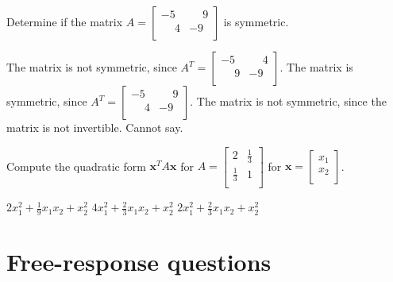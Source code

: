 \documentclass[11pt]{exam}
\begin{document}
\begin{questions}
\addpoints
\question[2]
Determine if the matrix $A= \left[\begin{array}{cc}-5 & \phantom{-}9 \\ \phantom{-}4 & -9 \\ \end{array}\right]$ is symmetric.

\begin{choices}
\choice The matrix is not symmetric, since $A^{T}=\left[\begin{array}{cc}-5 & \phantom{-}4 \\ \phantom{-}9 & -9 \\ \end{array}\right]$. %
\choice The matrix is symmetric, since $A^{T}=\left[\begin{array}{cc}-5 & \phantom{-}9 \\ \phantom{-}4 & -9 \\ \end{array}\right]$.
\choice The matrix is not symmetric, since the matrix is not invertible.
\choice Cannot say.
\end{choices}
\answerline

\addpoints
\question[2]
Compute the quadratic form $\mathbf{x}^{T}A\mathbf{x}$ for $A=\left[\begin{array}{cc}2 & \frac{1}{3} \\ \frac{1}{3} & 1 \\ \end{array}\right]$ for $\mathbf{x}=\left[\begin{array}{c} x_{1} \\ x_{2} \\ \end{array}\right]$.

\begin{oneparchoices}
\choice $2x_{1}^{2}+\frac{1}{9}x_{1}x_{2}+x_{2}^{2}$
\choice $4x_{1}^{2}+\frac{2}{3}x_{1}x_{2}+x_{2}^{2}$
\choice $2x_{1}^{2}+\frac{2}{3}x_{1}x_{2}+x_{2}^{2}$ %
\end{oneparchoices}
\answerline

\section{Free-response questions}
\newpage



\end{questions}
\end{document}
